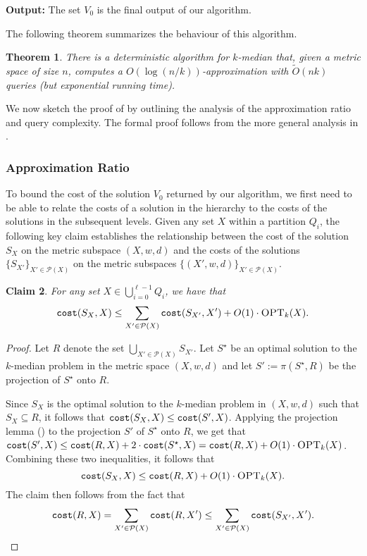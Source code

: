 \documentclass[11pt]{article}
\newcommand{\1}{\mathmybb{1}}
\newtheorem{theorem}{Theorem}[section]
\newtheorem{claim}[theorem]{Claim}
\newcommand{\proj}{\pi}
\newcommand{\OPT}{\textsc{OPT}}
\newcommand{\cost}{\textnormal{\texttt{cost}}}
\begin{document}
\medskip
\noindent
\textbf{Output:}
The set $V_0$ is the final output of our algorithm.

\medskip

The following theorem summarizes the behaviour of this algorithm.

\begin{theorem}\label{thm:intro:query}
    There is a deterministic algorithm for $k$-median that, given a metric space of size $n$, computes a $O(\log(n/k))$-approximation with $\tilde O(nk)$ queries (but exponential running time).
\end{theorem}



We now sketch the proof of  by outlining the analysis of the approximation ratio and query complexity. The formal proof follows from the more general analysis in .

\subsubsection*{Approximation Ratio}


To bound the cost of the solution $V_0$ returned by our algorithm, we first need to be able to relate the costs of a solution in the hierarchy to the costs of the solutions in the subsequent levels.
Given any set $X$ within a partition $Q_i$, the following key claim establishes the relationship between the cost of the solution $S_X$ on the metric subspace $(X,w,d)$ and the costs of the solutions $\{S_{X'}\}_{X' \in \mathcal P(X)}$ on the metric subspaces $\{(X',w,d)\}_{X' \in \mathcal P(X)}$.


\begin{claim}\label{claim:apx:1}
For any set $X \in \bigcup_{i=0}^{\ell - 1} Q_i$, we have that
$$ \cost(S_X, X) \leq \sum_{X' \in \mathcal P(X)} \cost(S_{X'}, X') + O(1) \cdot \OPT_k(X). $$
\end{claim}

\begin{proof}
    Let $R$ denote the set $\bigcup_{X' \in \mathcal P(X)} S_{X'}$. Let $S^\star$ be an optimal solution to the $k$-median problem in the metric space $(X,w,d)$ and let $S' := \proj(S^\star, R)$ be the projection of $S^\star$ onto $R$. 
    
    Since $S_X$ is the optimal solution to the $k$-median problem in $(X,w,d)$ such that $S_X \subseteq R$, it follows that $\cost(S_X, X) \leq \cost(S', X)$.
    Applying the projection lemma () to the projection $S'$ of $S^\star$ onto $R$, we get that $\cost(S', X) \leq \cost(R, X) + 2 \cdot \cost(S^\star, X) = \cost(R, X) + O(1) \cdot \OPT_k(X)$.
    Combining these two inequalities, it follows that
    \begin{equation}\label{eq:kay apx}
        \cost(S_X, X) \leq \cost(R, X) + O(1) \cdot \OPT_k(X).
    \end{equation}
    The claim then follows from the fact that 
    $$ \cost(R,X) = \sum_{X' \in \mathcal P(X)} \cost(R, X') \leq \sum_{X' \in \mathcal P(X)} \cost(S_{X'}, X').\qedhere $$
\end{proof}
\end{document}

